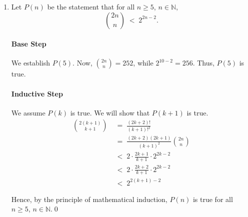 \documentclass[10pt]{article}
\begin{document}
\begin{enumerate}
                Hence, by the principle of mathematical induction, $P(n)$ is true for all $n \in \mathbb{N}$.\qed\\

                \item Let $P(n)$ be the statement that for all $n \geq 5$, $n \in \mathbb{N}$,
                \[\binom{2n}{n} \;<\; 2^{2n - 2}.\]
                \paragraph{Base Step}
                We establish $P(5)$. Now, $\binom{2n}{n} = 252$, while $2^{10 - 2} = 256$. Thus, $P(5)$ is true.
                \paragraph{Inductive Step}
                We assume $P(k)$ is true. We will show that $P(k + 1)$ is true.
                \begin{align*}
                \binom{2(k + 1)}{k + 1} \;&=\; \frac{(2k + 2)!}{(k + 1)!^2} \\
                        \;&=\; \frac{(2k + 2)(2k + 1)}{(k + 1)^2} \binom{2n}{n} \\
                        \;&<\; 2\cdot \frac{2k + 1}{k + 1} \cdot 2^{2k - 2} \\
                        \;&<\; 2\cdot \frac{2k + 2}{k + 1} \cdot 2^{2k - 2} \\
                        \;&<\; 2^{2(k + 1) - 2}
                \end{align*}
                
                Hence, by the principle of mathematical induction, $P(n)$ is true for all $n \geq 5$, $n \in \mathbb{N}$.\qed\\
        \end{enumerate}
        
\end{document}
